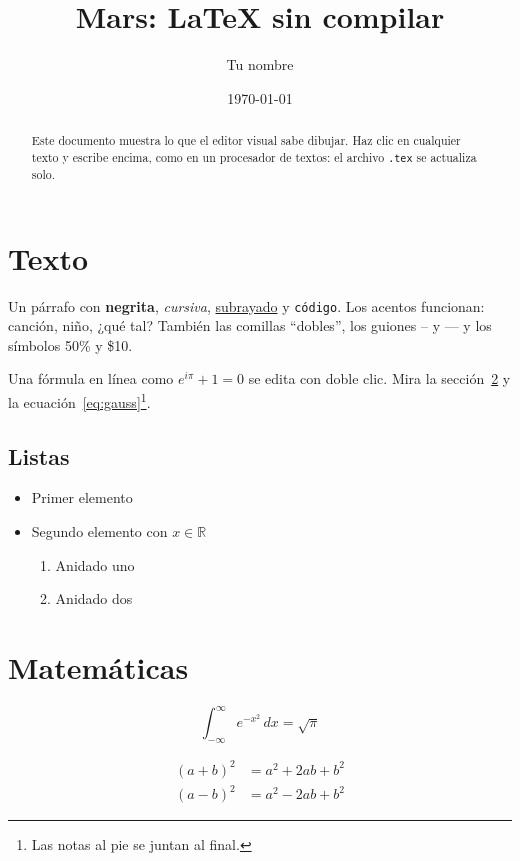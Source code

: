 \documentclass{article}
\title{Mars: LaTeX sin compilar}
\author{Tu nombre}
\date{\today}
\newcommand{\R}{\mathbb{R}}
\begin{document}
\maketitle

\begin{abstract}
Este documento muestra lo que el editor visual sabe dibujar. Haz clic en cualquier texto y
escribe encima, como en un procesador de textos: el archivo \texttt{.tex} se actualiza solo.
\end{abstract}

\tableofcontents

\section{Texto} \label{sec:texto}

Un párrafo con \textbf{negrita}, \textit{cursiva}, \underline{subrayado} y \texttt{código}.
Los acentos funcionan: canción, niño, ¿qué tal? %
También las comillas ``dobles'', los guiones -- y --- y los símbolos 50\% y \$10.

Una fórmula en línea como $e^{i\pi} + 1 = 0$ se edita con doble clic. Mira la
sección~\ref{sec:mates} y la ecuación~\eqref{eq:gauss}\footnote{Las notas al pie se juntan al final.}.

\subsection{Listas}

\begin{itemize}
  \item Primer elemento
  \item Segundo elemento con $x \in \R$
  \begin{enumerate}
    \item Anidado uno
    \item Anidado dos
  \end{enumerate}
\end{itemize}

\section{Matemáticas} \label{sec:mates}

\begin{equation} \label{eq:gauss}
  \int_{-\infty}^{\infty} e^{-x^2} \, dx = \sqrt{\pi}
\end{equation}

\begin{align}
  (a+b)^2 &= a^2 + 2ab + b^2 \\
  (a-b)^2 &= a^2 - 2ab + b^2
\end{align}
\end{document}
